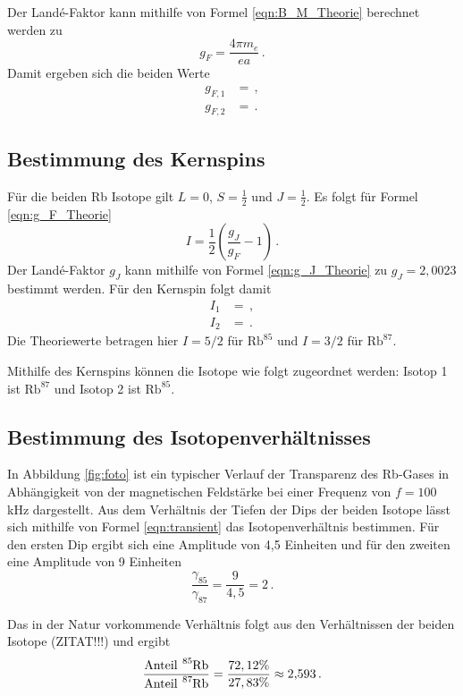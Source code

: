 Der Landé-Faktor kann mithilfe von Formel \ref{eqn:B_M_Theorie} berechnet werden zu
\begin{equation*}
  g_F=\frac{4\pi m_e}{e a} \,.
\end{equation*}
Damit ergeben sich die beiden Werte
\begin{align*}
  g_{F,1}&= \,,\\
  g_{F,2}&= \,.
\end{align*}

\subsection{Bestimmung des Kernspins}
\label{subsec:Kernspin}

Für die beiden Rb Isotope gilt $L=0$, $S=\frac{1}{2}$ und $J=\frac{1}{2}$.
Es folgt für Formel \eqref{eqn:g_F_Theorie}
\begin{equation*}
  I=\frac{1}{2}\left(\frac{g_J}{g_F}-1\right) \,.
\end{equation*}
Der Landé-Faktor $g_J$ kann mithilfe von Formel \ref{eqn:g_J_Theorie} zu $g_J=2{,}0023$ bestimmt
werden. Für den Kernspin folgt damit
\begin{align*}
  I_1&= \,,\\
  I_2&= \,.
\end{align*}
Die Theoriewerte betragen hier $I=5/2$ für $\text{Rb}^{85}$ und $I=3/2$ für $\text{Rb}^{87}$.

Mithilfe des Kernspins können die Isotope wie folgt zugeordnet werden: Isotop 1 ist $\text{Rb}^{87}$
und Isotop 2 ist $\text{Rb}^{85}$.


\subsection{Bestimmung des Isotopenverhältnisses}
\label{subsec:Isotope}
In Abbildung \ref{fig:foto} ist ein typischer Verlauf der Transparenz des Rb-Gases in Abhängigkeit
von der magnetischen Feldstärke bei einer Frequenz von $f=100\,$kHz dargestellt.
Aus dem Verhältnis der Tiefen der Dips der beiden
Isotope lässt sich mithilfe von Formel \ref{eqn:transient} das Isotopenverhältnis bestimmen.
Für den ersten Dip ergibt sich eine Amplitude von 4{,}5 Einheiten und für den zweiten
eine Amplitude von 9 Einheiten
\begin{equation}
  \frac{\gamma_{85}}{\gamma_{87}}=\frac{9}{4{,}5}= 2 \,.
\end{equation}

Das in der Natur vorkommende Verhältnis folgt aus den Verhältnissen der beiden Isotope (ZITAT!!!)
und ergibt
\begin{equation}
  \frac{\text{Anteil}~ \ce{^{85}Rb}}{\text{Anteil}~ \ce{^{87}Rb}}=\frac{72,12\%}{27,83\%} \approx 2{,}593 \,.
\end{equation}


